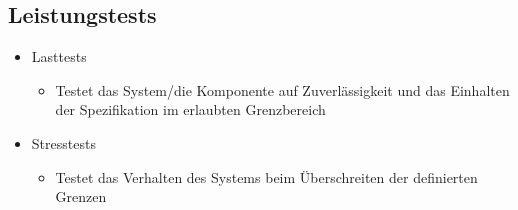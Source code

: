 \documentclass{article}
\begin{document}
\subsection{Leistungstests}
\begin{itemize}
  \item Lasttests
  \begin{itemize}
    \item Testet das System/die Komponente auf Zuverlässigkeit und das Einhalten der Spezifikation im erlaubten Grenzbereich
  \end{itemize}
  \item Stresstests
  \begin{itemize}
    \item Testet das Verhalten des Systems beim Überschreiten der definierten Grenzen
  \end{itemize}
\end{itemize}
\end{document}
